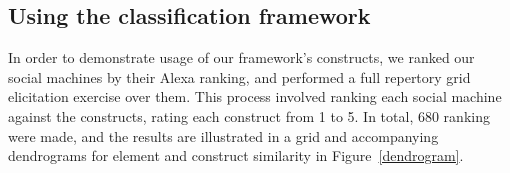 \documentclass{sig-alternate}
\begin{document}

\subsection{Using the classification framework}

In order to demonstrate usage of our framework's constructs, we ranked our social machines
by their Alexa ranking, and performed a full repertory grid elicitation exercise over them.
This process involved ranking each social machine against the constructs, rating each construct
from 1 to 5. In total, 680 ranking were made, and the
results are illustrated in a grid and accompanying dendrograms for element and construct
similarity in Figure~\ref{dendrogram}.
\end{document}
